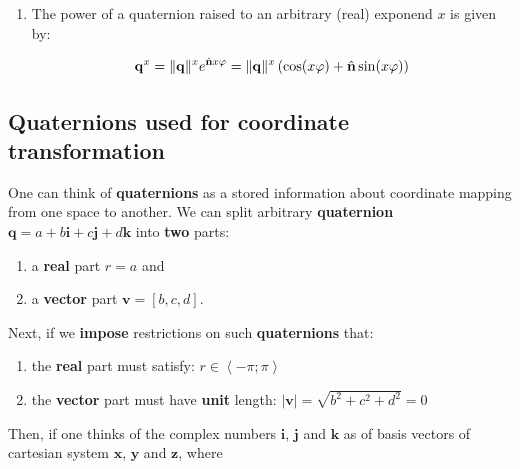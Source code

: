 \begin{enumerate}
        Any unit quaternion may be expressed in polar form as:

        \begin{equation}
            \m{q} = \exp(\hat{\m{n}} \varphi)
        \end{equation}

    \item The power of a quaternion raised to an arbitrary (real) exponend $ x $ is
        given by:

        \begin{equation}
            \mathbf{q}^x = \| {\mathbf{q}} \|^x e^{\hat{\mathbf{n}} x \varphi}
            = \| {\mathbf{q}} \|^x
            \left(\cos(x \varphi) + \hat{\mathbf{n}} \sin(x \varphi) \right)
        \end{equation}

\end{enumerate}


\subsection{Quaternions used for coordinate transformation}

One can think of \textbf{quaternions} as a stored information about coordinate
mapping from one space to another. We can split arbitrary \textbf{quaternion}\\
$ \mathbf{q} = a + b \mathbf{i} + c \mathbf{j} + d \mathbf{k} $ into \textbf{two} parts:

\begin{enumerate}
    \item a \textbf{real} part $ r = a $ and

    \item a \textbf{vector} part $ \mathbf{v} = \left[ b, c, d \right] $.

\end{enumerate}

Next, if we \textbf{impose} restrictions on such \textbf{quaternions} that:

\begin{enumerate}
    \item the \textbf{real} part must satisfy: $ r \in \left< -\pi; \pi \right> $

    \item the \textbf{vector} part must have \textbf{unit} length:
        $ | \textbf{v} | = \sqrt{b^2 + c^2 + d^2} = 0 $

\end{enumerate}

Then, if one thinks of the complex numbers $ \mathbf{i} $, $ \mathbf{j} $ and $ \mathbf{k} $
as of basis vectors of cartesian system $ \mathbf{x} $, $ \mathbf{y} $ and $ \mathbf{z} $, where

